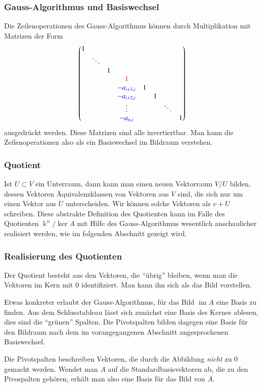 \subsubsection{Gauss-Algorithmus und Basiswechsel}
Die Zeilenoperationen des Gauss-Algorithmus können durch Multiplikation
mit Matrizen der Form
\[
\begin{pmatrix}
1&      & &                        & & &      & \\
 &\ddots& &                        & & &      & \\
 &      &1&                        & & &      & \\
 &      & &{\color{red}1}          & & &      & \\
 &      & &{\color{blue}-a_{i+1,i}}&1& &      & \\
 &      & &{\color{blue}-a_{i+2,i}}& &1&      & \\
 &      & &\vdots                  & & &\ddots& \\
 &      & &{\color{blue}-a_{n,i}}  & & &      &1
\end{pmatrix}
\]
ausgedrückt werden.
Diese Matrizen sind alle invertiertbar.
Man kann die Zeilenoperationen also als ein Basiswechsel im Bildraum
verstehen.

\subsubsection{Quotient}
Ist $U\subset V$ ein Unterraum, dann kann man einen neuen Vektorraum
$V/U$ bilden, dessen Vektoren Äquivalenzklassen von Vektoren aus $V$
sind, die sich nur um einen Vektor aus $U$ unterscheiden.
Wir können solche Vektoren als $v+U$ schreiben. 
Diese abstrakte Definition des Quotienten kann im Falle 
des Quotienten $\Bbbk^n / \ker A$ mit Hilfe des
Gauss-Algorithmus wesentlich anschaulicher realisiert werden,
wie im folgenden Abschnitt gezeigt wird.

\subsubsection{Realisierung des Quotienten}
Der Quotient besteht aus den Vektoren, die ``übrig'' bleiben, wenn man die
Vektoren im Kern mit $0$ identifiziert.
Man kann ihn sich als das Bild vorstellen.

Etwas konkreter erlaubt der Gauss-Algorithmus,
für das Bild $\operatorname{im}A$ eine Basis zu finden.
Aus dem Schlusstableau lässt sich zunächst eine Basis des Kernes
ablesen, dies sind die ``grünen'' Spalten.
Die Pivotspalten bilden dagegen eine Basis für den Bildraum
nach dem im vorangegangenen Abschnitt angesprochenen Basiswechsel.

Die Pivotspalten beschreiben Vektoren, die durch die Abbildung {\em nicht}
zu $0$ gemacht werden.
Wendet man $A$ auf die Standardbasisvektoren ab, die zu den 
Pivospalten gehören, erhält man also eine Basis für das Bild
von $A$.

